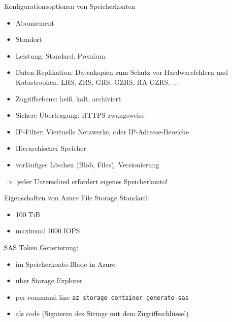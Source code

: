 \begin{flashcard}[Definition]{Konfigurationsoptionen von Speicherkonten}
    \begin{itemize}
        \item Abonnement
        \item Standort
        \item Leistung: Standard, Premium
        \item Daten-Replikation: Datenkopien zum Schutz vor Hardwarefehlern und Katastrophen. LRS, ZRS, GRS, GZRS, RA-GZRS, ...
        \item Zugriffsebene: heiß, kalt, archiviert
        \item Sichere Übertragung: HTTPS zwangsweise
        \item IP-Filter: Viertuelle Netzwerke, oder IP-Adresse-Bereiche
        \item Hierarchischer Speicher
        \item vorläufiges Löschen (Blob, Files), Versionierung
    \end{itemize}
    $\Rightarrow$ jeder Unterschied erfordert eigenes Speicherkonto!
\end{flashcard}

\begin{flashcard}[Definition]{Eigenschaften von Azure File Storage}
    Standard:
    \begin{itemize}
        \item 100 TiB
        \item maximual 1000 IOPS
    \end{itemize}
\end{flashcard}


\begin{flashcard}[Definition]{SAS Token}
    Generierung:
    \begin{itemize}
        \item im Speicherkonto-Blade in Azure
        \item über Storage Explorer
        \item per command line\newline
            \texttt{az storage container generate-sas}
        \item als code (Signieren des Strings mit dem Zugriffsschlüssel)
    \end{itemize}
\end{flashcard}

